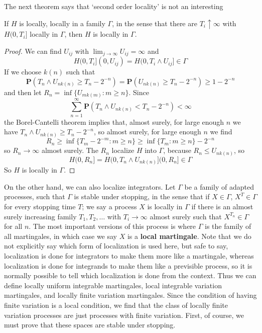 The next theorem says that `second order locality' is not an interesting 

\begin{theorem}
    If $H$ is locally, locally in a family $\Gamma$, in the sense that there are $T_i \uparrow \infty$ with $H(0,T_i]$ locally in $\Gamma$, then $H$ is locally in $\Gamma$.
\end{theorem}
\begin{proof}
    We can find $U_{ij}$ with $\lim_{j \to \infty} U_{ij} = \infty$ and
    \[ H(0,T_i](0,U_{ij}) = H(0,T_i \wedge U_{ij}] \in \Gamma \]
    If we choose $k(n)$ such that 
    \[ \mathbf{P}(T_n \wedge U_{nk(n)} \geq T_n - 2^{-n}) = \mathbf{P}(U_{nk(n)} \geq T_n - 2^{-n}) \geq 1 - 2^{-n} \]
    and then let $R_n = \inf \{ U_{mk(m)}: m \geq n \}$. Since
    \[ \sum_{n = 1}^\infty \mathbf{P}(T_n \wedge U_{nk(n)} < T_n - 2^{-n}) < \infty \]
    the Borel-Cantelli theorem implies that, almost surely, for large enough $n$ we have $T_n \wedge U_{nk(n)} \geq T_n - 2^{-n}$, so almost surely, for large enough $n$ we find
    \[ R_n \geq \inf \{ T_m - 2^{-m}: m \geq n \} \geq \inf \{ T_m : m \geq n \} - 2^{-n} \]
    so $R_n \to \infty$ almost surely. The $R_n$ localize $H$ into $\Gamma$, because $R_n \leq U_{nk(n)}$, so
    \[ H(0,R_n] = H(0,T_n \wedge U_{nk(n)}](0,R_n] \in \Gamma \]
    So $H$ is locally in $\Gamma$.
\end{proof}

On the other hand, we can also localize integrators. Let $\Gamma$ be a family of adapted processes, such that $\Gamma$ is stable under stopping, in the sense that if $X \in \Gamma$, $X^T \in \Gamma$ for every stopping time $T$; we say a process $X$ is locally in $\Gamma$ if there is an almost surely increasing family $T_1, T_2, \dots$ with $T_i \to \infty$ almost surely such that $X^{T_n} \in \Gamma$ for all $n$. The most important versions of this process is where $\Gamma$ is the family of all martingales, in which case we say $X$ is a {\bf local martingale}. Note that we do not explicitly say which form of localization is used here, but safe to say, localization is done for integrators to make them more like a martingale, whereas localization is done for integrands to make them like a previsible process, so it is normally possible to tell which localization is done from the context. Thus we can define locally uniform integrable martingales, local integrable variation martingales, and locally finite variation martingales. Since the condition of having finite variation is a local condition, we find that the class of locally finite variation processes are just processes with finite variation. First, of course, we must prove that these spaces are stable under stopping.

